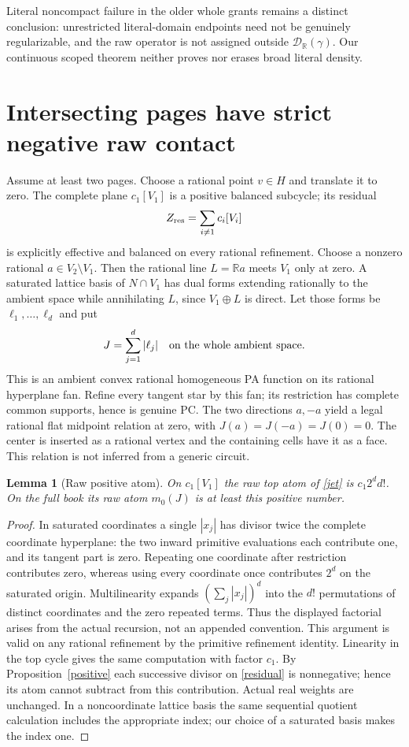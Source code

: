 \documentclass[11pt]{article}
\newtheorem{lemma}[theorem]{Lemma}
\theoremstyle{definition}\newtheorem{definition}[theorem]{Definition}
\theoremstyle{remark}\newtheorem{remark}[theorem]{Remark}
\newcommand{\R}{\mathbb R}\newcommand{\Q}{\mathbb Q}
\newcommand{\D}{\mathcal D_{\R}(\gamma)}
\begin{document}
Literal noncompact failure in the older whole grants remains a distinct conclusion: unrestricted literal-domain endpoints need not be genuinely regularizable, and the raw operator is not assigned outside $\D$. Our continuous scoped theorem neither proves nor erases broad literal density.

\section{Intersecting pages have strict negative raw contact}
Assume at least two pages. Choose a rational point $v\in H$ and translate it to zero. The complete plane $c_1[V_1]$ is a positive balanced subcycle; its residual
\begin{equation}\label{residual}
Z_{\rm res}=\sum_{i\ne1}c_i[V_i]
\end{equation}
is explicitly effective and balanced on every rational refinement. Choose a nonzero rational $a\in V_2\setminus V_1$. Then the rational line $L=\R a$ meets $V_1$ only at zero. A saturated lattice basis of $N\cap V_1$ has dual forms extending rationally to the ambient space while annihilating $L$, since $V_1\oplus L$ is direct. Let those forms be $\ell_1,\ldots,\ell_d$ and put
\begin{equation}\label{jet}
J=\sum_{j=1}^d|\ell_j|\quad\hbox{on the whole ambient space}.
\end{equation}
This is an ambient convex rational homogeneous PA function on its rational hyperplane fan. Refine every tangent star by this fan; its restriction has complete common supports, hence is genuine PC. The two directions $a,-a$ yield a legal rational flat midpoint relation at zero, with $J(a)=J(-a)=J(0)=0$. The center is inserted as a rational vertex and the containing cells have it as a face. This relation is not inferred from a generic circuit.

\begin{lemma}[Raw positive atom]\label{atom}
On $c_1[V_1]$ the raw top atom of \eqref{jet} is $c_1 2^d d!$. On the full book its raw atom $m_0(J)$ is at least this positive number.
\end{lemma}
\begin{proof}
In saturated coordinates a single $|x_j|$ has divisor twice the complete coordinate hyperplane: the two inward primitive evaluations each contribute one, and its tangent part is zero. Repeating one coordinate after restriction contributes zero, whereas using every coordinate once contributes $2^d$ on the saturated origin. Multilinearity expands $(\sum_j|x_j|)^d$ into the $d!$ permutations of distinct coordinates and the zero repeated terms. Thus the displayed factorial arises from the actual recursion, not an appended convention. This argument is valid on any rational refinement by the primitive refinement identity. Linearity in the top cycle gives the same computation with factor $c_1$. By Proposition~\ref{positive} each successive divisor on \eqref{residual} is nonnegative; hence its atom cannot subtract from this contribution. Actual real weights are unchanged. In a noncoordinate lattice basis the same sequential quotient calculation includes the appropriate index; our choice of a saturated basis makes the index one.
\end{proof}
\end{document}
